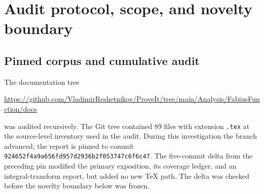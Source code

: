 \documentclass[11pt]{article}
\theoremstyle{definition}
\theoremstyle{remark}
\newcommand{\Up}{\operatorname{up}}
\begin{document}
\begin{abstract}
A second positive approximation is obtained by differentiating the Bernstein
polynomial of $F$: $p$ is the uniform limit of finite mixtures of beta densities
with rational weights $\Delta_{N,k}$.  Its moment-generating and Fourier
transforms are therefore limits of positive rational mixtures of confluent
hypergeometric functions.  A dual construction uses dyadic values of the inverse
$G=F^{-1}$: equal probability cells with variable spatial widths give a finite
sinc-mixture formula for $\widehat\Up$, as well as polynomial limits for all
moments.

Finally, the exact Haar detail energy $E_N$ is rational and has an all-orders
continuum expansion
\[
 E_N\sim \frac{h^2}{16}\|p'\|_2^2-
             \frac{h^4}{384}\|p''\|_2^2+
             \frac{h^6}{20480}\|p'''\|_2^2-\cdots,
 \qquad h=2^{-N}.
\]
The complete coefficient sequence is generated by $\sinc^4$, hence by complete
Bell polynomials in Bernoulli numbers.  The beyond-all-orders aliasing remainder
provides a new place where the known log-periodic Fourier decay should reappear.
The report distinguishes repository input, results proved here, numerical checks,
and conjectures; ``new'' always means new relative to the audited repository
corpus, not an assertion of worldwide priority.
\end{abstract}


\clearpage

\section{Audit protocol, scope, and novelty boundary}
\label{p3:sec:audit}

\subsection{Pinned corpus and cumulative audit}

The documentation tree
\begin{center}
\url{https://github.com/VladimirReshetnikov/ProveIt/tree/main/Analysis/FabiusFunction/docs}
\end{center}
was audited recursively.  The Git tree contained $89$ files with extension
\texttt{.tex} at the source-level inventory used in the audit.  During this
investigation the branch advanced; the report is pinned to commit
\nolinkurl{924652f4a9a656fd957d2936b2f053747c6f6c47}.  The five-commit delta from
the preceding pin modified the primary exposition, its coverage ledger, and an
integral-transform report, but added no new TeX path.  The delta was checked
before the novelty boundary below was frozen.
\end{document}
